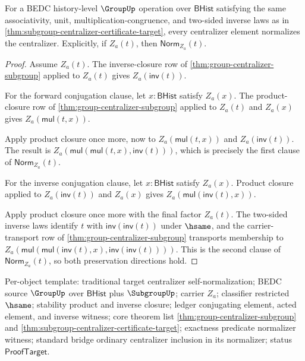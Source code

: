 \begin{theorem}
\label{thm:subgroup-centralizer-self-normalizer}
For a BEDC history-level $\GroupUp$ operation over $\mathsf{BHist}$ satisfying
the same associativity, unit, multiplication-congruence, and two-sided inverse
laws as in \autoref{thm:subgroup-centralizer-certificate-target}, every
centralizer element normalizes the centralizer. Explicitly, if $Z_a(t)$, then
$\mathsf{Norm}_{Z_a}(t)$.
\end{theorem}
\begin{proof}
Assume $Z_a(t)$. The inverse-closure row of
\autoref{thm:group-centralizer-subgroup} applied to $Z_a(t)$ gives
$Z_a(\mathsf{inv}(t))$.

For the forward conjugation clause, let $x:\mathsf{BHist}$ satisfy $Z_a(x)$.
The product-closure row of \autoref{thm:group-centralizer-subgroup} applied to
$Z_a(t)$ and $Z_a(x)$ gives $Z_a(\mathsf{mul}(t,x))$.

Apply product closure once more, now to $Z_a(\mathsf{mul}(t,x))$ and
$Z_a(\mathsf{inv}(t))$. The result is
$Z_a(\mathsf{mul}(\mathsf{mul}(t,x),\mathsf{inv}(t)))$, which is precisely
the first clause of $\mathsf{Norm}_{Z_a}(t)$.

For the inverse conjugation clause, let $x:\mathsf{BHist}$ satisfy $Z_a(x)$.
Product closure applied to $Z_a(\mathsf{inv}(t))$ and $Z_a(x)$ gives
$Z_a(\mathsf{mul}(\mathsf{inv}(t),x))$.

Apply product closure once more with the final factor $Z_a(t)$. The two-sided
inverse laws identify $t$ with $\mathsf{inv}(\mathsf{inv}(t))$ under $\hsame$,
and the carrier-transport row of \autoref{thm:group-centralizer-subgroup}
transports membership to
$Z_a(\mathsf{mul}(\mathsf{mul}(\mathsf{inv}(t),x),
\mathsf{inv}(\mathsf{inv}(t))))$. This is the second clause of
$\mathsf{Norm}_{Z_a}(t)$, so both preservation directions hold.
\end{proof}

Per-object template: traditional target centralizer self-normalization; BEDC
source $\GroupUp$ over $\mathsf{BHist}$ plus $\SubgroupUp$; carrier $Z_a$;
classifier restricted $\hsame$; stability product and inverse closure; ledger
conjugating element, acted element, and inverse witness; core theorem list
\autoref{thm:group-centralizer-subgroup} and
\autoref{thm:subgroup-centralizer-certificate-target}; exactness predicate
normalizer witness; standard bridge ordinary centralizer inclusion in its
normalizer; status $\mathsf{ProofTarget}$.

